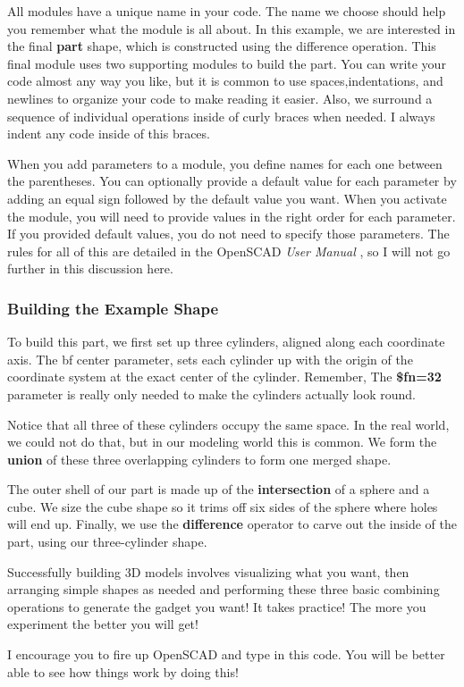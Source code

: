 All modules have a unique name in your code.
The name we choose should help you remember what the module is
all about. In this example, we are interested in the final {\bf part} shape,
which is constructed using the difference operation. This final module uses two
supporting modules to build the part. You can write your code almost any way
you like, but it is common to use spaces,indentations, and newlines to organize
your code to make reading it easier.
Also, we
surround a sequence of individual operations inside of curly braces when
needed. I always indent any code inside of this braces.

When you add parameters to a module, you define names for each one between the
parentheses. You can optionally provide a default value for each parameter by
adding an equal sign followed by the default value you want. When you activate
the module, you will need to provide values in the right order for each
parameter. If you provided default values, you do not need to specify those
parameters.  The rules for all of this are detailed in the OpenSCAD {\it User
Manual} \cite{userman}, so I will not go further in this discussion here.

\subsubsection*{Building the Example Shape}

To build this part, we first set up three cylinders, aligned along each
coordinate axis. The {bf center} parameter, sets each cylinder up with the
origin of the coordinate system at the exact center of the cylinder. Remember, The {\bf
\$fn=32} parameter is really only needed to make the cylinders actually look
round.

Notice that all three of these cylinders occupy the same space. In the real
world, we could not do that, but in our modeling world this is common. We form
the {\bf union} of these three overlapping cylinders to form one merged shape.

The outer shell of our part is made up of the {\bf intersection} of a sphere
and a cube. We size the cube shape so it trims off six sides of the sphere
where holes will end up.  Finally, we use the {\bf difference} operator to
carve out the inside of the part, using our three-cylinder shape.

Successfully building 3D models involves visualizing what you want, then
arranging simple shapes as needed and performing these three basic combining
operations to generate the gadget you want! It takes practice! The more you
experiment the better you will get!

I encourage you to fire up OpenSCAD and type in this code. You will be better
able to see how things work by doing this!
